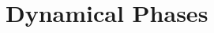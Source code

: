 \documentclass[prb,aps,twocolumn,superscriptaddress,floatfix]{revtex4-1}
\newcommand{\aleadd}[1]{{\color{blue}#1}}
\newcommand{\fabriq}[1]{{\color{red!60!blue}#1}}
\newcommand{\luzcom}[1]{{\color{green!50!black}#1}}
\begin{document}












\section{Dynamical Phases}\label{sec:dynamicalphases}

\end{document}
